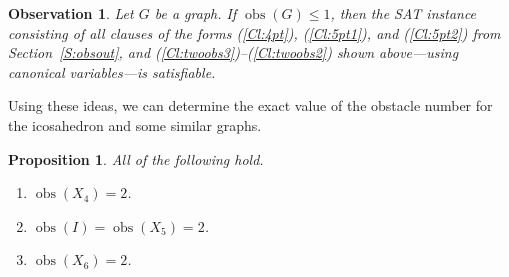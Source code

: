 \documentclass[12pt]{amsart}
\newtheorem{proposition}[theorem]{Proposition}
\newtheorem{observation}[theorem]{Observation}
\theoremstyle{remark}
\newcommand{\be}{\begin{enumerate}}
\newcommand{\ee}{\end{enumerate}}
\DeclareMathOperator{\obs}{\ensuremath{\mathrm{obs}}}
\begin{document}
%
%

\begin{observation} \label{O:sat-obs}
Let $G$ be a graph.
If $\obs(G) \le 1$,
then the SAT instance consisting of
all clauses
of the forms
(\ref{Cl:4pt}),
(\ref{Cl:5pt1}), and (\ref{Cl:5pt2}) from Section~\ref{S:obsout},
and
(\ref{Cl:twoobs3})--(\ref{Cl:twoobs2})
shown above---using canonical variables---is
satisfiable.
\end{observation}

Using these ideas,
we can determine the exact value of the obstacle number for
the icosahedron and some similar graphs.

\begin{proposition} \label{P:gesdp-obs}
All of the following hold.
\be
\item $\obs(X_{4}) = 2$.
\item $\obs(I)= \obs(X_{5}) = 2$.
\item $\obs(X_{6}) = 2$.
\ee
\end{proposition}
\end{document}

